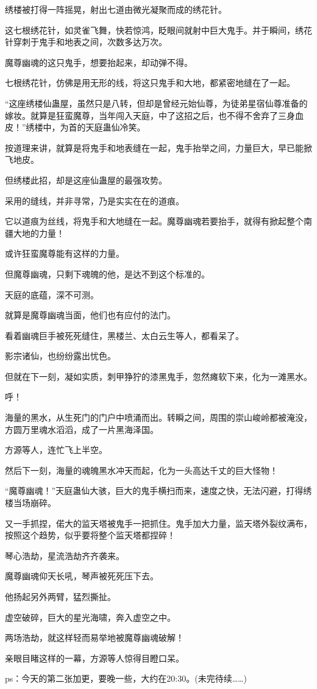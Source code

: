 \begin{this_body}
绣楼被打得一阵摇晃，射出七道由微光凝聚而成的绣花针。

这七根绣花针，如灵雀飞舞，快若惊鸿，眨眼间就射中巨大鬼手。并于瞬间，绣花针穿刺于鬼手和地表之间，次数多达万次。

魔尊幽魂的这只鬼手，想要抬起来，却动弹不得。

七根绣花针，仿佛是用无形的线，将这只鬼手和大地，都紧密地缝在了一起。

“这座绣楼仙蛊屋，虽然只是八转，但却是曾经元始仙尊，为徒弟星宿仙尊准备的嫁妆。就算是狂蛮魔尊，当年闯入天庭，中了这招之后，也不得不舍弃了三身血皮！”绣楼中，为首的天庭蛊仙冷笑。

按道理来讲，就算是将鬼手和地表缝在一起，鬼手抬举之间，力量巨大，早已能掀飞地皮。

但绣楼此招，却是这座仙蛊屋的最强攻势。

采用的缝线，并非寻常，乃是实实在在的道痕。

它以道痕为丝线，将鬼手和大地缝在一起。魔尊幽魂若要抬手，就得有掀起整个南疆大地的力量！

或许狂蛮魔尊能有这样的力量。

但魔尊幽魂，只剩下魂魄的他，是达不到这个标准的。

天庭的底蕴，深不可测。

就算是魔尊幽魂当面，他们也有应付的法门。

看着幽魂巨手被死死缝住，黑楼兰、太白云生等人，都看呆了。

影宗诸仙，也纷纷露出忧色。

但就在下一刻，凝如实质，刺甲狰狞的漆黑鬼手，忽然瘫软下来，化为一滩黑水。

呼！

海量的黑水，从生死门的门户中喷涌而出。转瞬之间，周围的崇山峻岭都被淹没，方圆万里魂水滔滔，成了一片黑海泽国。

方源等人，连忙飞上半空。

然后下一刻，海量的魂魄黑水冲天而起，化为一头高达千丈的巨大怪物！

“魔尊幽魂！”天庭蛊仙大骇，巨大的鬼手横扫而来，速度之快，无法闪避，打得绣楼当场崩碎。

又一手抓捏，偌大的监天塔被鬼手一把抓住。鬼手加大力量，监天塔外裂纹满布，按照这个趋势，似乎要将整个监天塔都捏碎！

琴心浩劫，星流浩劫齐齐袭来。

魔尊幽魂仰天长吼，琴声被死死压下去。

他扬起另外两臂，猛烈撕扯。

虚空破碎，巨大的星光海啸，奔入虚空之中。

两场浩劫，就这样轻而易举地被魔尊幽魂破解！

亲眼目睹这样的一幕，方源等人惊得目瞪口呆。

ps：今天的第二张加更，要晚一些，大约在20:30。(未完待续……)

\end{this_body}

